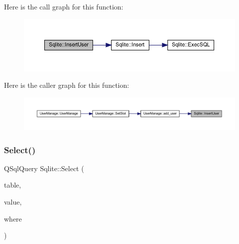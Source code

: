 Here is the call graph for this function\+:
\nopagebreak
\begin{figure}[H]
\begin{center}
\leavevmode
\includegraphics[width=350pt]{class_sqlite_a950aea188ad2f7285032756cfe0ecc6d_cgraph}
\end{center}
\end{figure}
Here is the caller graph for this function\+:
\nopagebreak
\begin{figure}[H]
\begin{center}
\leavevmode
\includegraphics[width=350pt]{class_sqlite_a950aea188ad2f7285032756cfe0ecc6d_icgraph}
\end{center}
\end{figure}
\mbox{\label{class_sqlite_a9a39cca147a504c82e98261707aa1e8d}} 
\subsubsection{\texorpdfstring{Select()}{Select()}}
{\footnotesize\ttfamily Q\+Sql\+Query Sqlite\+::\+Select (\begin{DoxyParamCaption}\item[{Q\+String}]{table,  }\item[{Q\+String}]{value,  }\item[{Q\+String}]{where }\end{DoxyParamCaption})}

